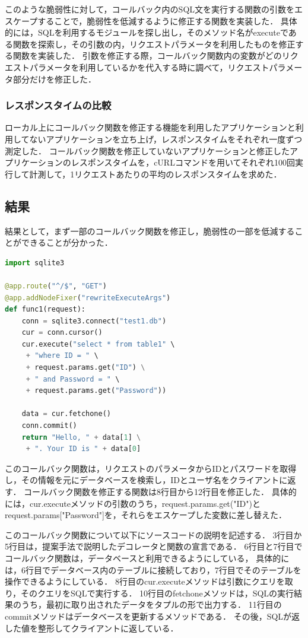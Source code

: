 \documentclass[submit]{ipsj}
\begin{document}
このような脆弱性に対して，コールバック内のSQL文を実行する関数の引数をエスケープすることで，脆弱性を低減するように修正する関数を実装した．
具体的には，SQLを利用するモジュールを探し出し，そのメソッド名がexecuteである関数を探索し，その引数の内，リクエストパラメータを利用したものを修正する関数を実装した．
引数を修正する際，コールバック関数内の変数がどのリクエストパラメータを利用しているかを代入する時に調べて，リクエストパラメータ部分だけを修正した．

\subsubsection{レスポンスタイムの比較}
ローカル上にコールバック関数を修正する機能を利用したアプリケーションと利用してないアプリケーションを立ち上げ，レスポンスタイムをそれぞれ一度ずつ測定した．
コールバック関数を修正していないアプリケーションと修正したアプリケーションのレスポンスタイムを，cURLコマンドを用いてそれぞれ100回実行して計測して，1リクエストあたりの平均のレスポンスタイムを求めた．



\subsection{結果}
結果として，まず一部のコールバック関数を修正し，脆弱性の一部を低減することができることが分かった．
\begin{lstlisting}[language=python]
import sqlite3

@app.route("^/$", "GET")
@app.addNodeFixer("rewriteExecuteArgs")
def func1(request):
    conn = sqlite3.connect("test1.db")
    cur = conn.cursor()
    cur.execute("select * from table1" \
     + "where ID = " \
     + request.params.get("ID") \
     + " and Password = " \
     + request.params.get("Password"))

    data = cur.fetchone()
    conn.commit()
    return "Hello, " + data[1] \
     + ". Your ID is " + data[0]

\end{lstlisting}

このコールバック関数は，リクエストのパラメータからIDとパスワードを取得し，その情報を元にデータベースを検索し，IDとユーザ名をクライアントに返す．
コールバック関数を修正する関数は8行目から12行目を修正した．
具体的には，cur.executeメソッドの引数のうち，request.params.get("ID")とrequest.params["Password"]を，それらをエスケープした変数に差し替えた．

このコールバック関数について以下にソースコードの説明を記述する．
3行目か5行目は，提案手法で説明したデコレータと関数の宣言である．
6行目と7行目でコールバック関数は，データベースと利用できるようにしている，
具体的には，6行目でデータベース内のテーブルに接続しており，7行目でそのテーブルを操作できるようにしている．
8行目のcur.executeメソッドは引数にクエリを取り，そのクエリをSQLで実行する．
10行目のfetchoneメソッドは，SQLの実行結果のうち，最初に取り出されたデータをタプルの形で出力する．
11行目のcommitメソッドはデータベースを更新するメソッドである．
その後，SQLが返した値を整形してクライアントに返している．
\end{document}
